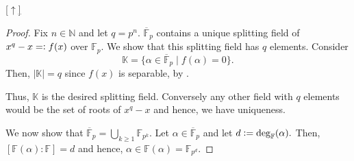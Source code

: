 \documentclass[12pt,oneside]{book}
\theoremstyle{definition}
\numberwithin{thm}{chapter}
\newcommand{\upsym}{[$\uparrow$]}
\newcommand{\md}[1]{{\left\lvert #1 \right\lvert}}
\begin{document}
\existencefinfields*\label{thm:existencefinfields2}
\begin{flushright}\hyperref[thm:existencefinfields]{\upsym}\end{flushright}
\begin{proof}
    Fix $n \in \mathbb{N}$ and let $q = p^n.$ $\overline{\mathbb{F}}_p$ contains a unique splitting field of $x^q - x =\vcentcolon f(x)$ over $\mathbb{F}_p.$ We show that this splitting field has $q$ elements. Consider
    \begin{equation*} 
        \mathbb{K} = \{\alpha \in \overline{\mathbb{F}}_p \mid f(\alpha) = 0\}.
    \end{equation*}
    Then, $\md{\mathbb{K}} = q$ since $f(x)$ is separable, by . 

    Thus, $\mathbb{K}$ is the desired splitting field. Conversely any other field with $q$ elements would be the set of roots of $x^q - x$ and hence, we have uniqueness.

    We now show that $\overline{\mathbb{F}}_p = \bigcup_{k \ge 1}\mathbb{F}_{p^k}.$ Let $\alpha \in \overline{\mathbb{F}}_p$ and let $d \vcentcolon= \deg_{\mathbb{F}}(\alpha).$ Then, $[\mathbb{F}(\alpha) : \mathbb{F}] = d$ and hence, $\alpha \in \mathbb{F}(\alpha) = \mathbb{F}_{p^d}.$
\end{proof}
\end{document}
